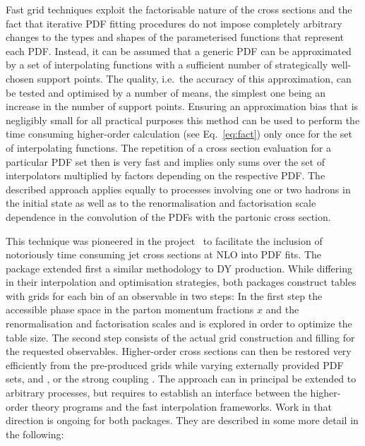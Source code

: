   Fast grid techniques exploit the factorisable nature of the cross sections and 
  the fact that iterative PDF fitting
  procedures do not impose completely arbitrary changes to the types
  and shapes of the parameterised functions that represent each PDF\@.
  Instead, it can be assumed that a generic PDF can be approximated by
  a set of interpolating functions with a sufficient number of
  strategically well-chosen support points. The quality, i.e.\ the
  accuracy of this approximation, can be tested and optimised by a
  number of means, the simplest one being an increase in the number of
  support points. Ensuring an approximation bias that is negligibly
  small for all practical purposes this method can be used to perform
  the time consuming higher-order calculation (see Eq.~\ref{eq:fact})
  only once for the set of interpolating functions. 
  The repetition of a cross section evaluation for
  a particular PDF set then is very fast and implies only sums over
  the set of interpolators multiplied by factors depending on the
  respective PDF\@. The described approach applies equally to
  processes involving one or two hadrons in the initial state as well
  as to the renormalisation and factorisation scale dependence in the
  convolution of the PDFs with the partonic cross section.

  This technique was pioneered in the \fastnlo
  project~\cite{Kluge:2006xs} to facilitate the inclusion of
  notoriously time consuming jet cross sections at NLO into PDF fits.
  The \applgrid~\cite{Carli:2010rw} package extended first a similar
  methodology to DY production. While differing in their interpolation
  and optimisation strategies, both packages construct tables with
  grids for each bin of an observable in two steps: In the first step
  the accessible phase space in the parton momentum fractions $x$ and
  the renormalisation and factorisation scales \mur and \muf is
  explored in order to optimize the table size. The second step
  consists of the actual grid construction and filling for the
  requested observables. Higher-order cross sections can then be
  restored very efficiently from the pre-produced grids while varying
  externally provided PDF sets, \mur and \muf, or the strong coupling
  \asq\@. The approach can in principal be extended to arbitrary
  processes, but requires to establish an interface between the
  higher-order theory programs and the fast interpolation
  frameworks. Work in that direction is ongoing for both packages.
  They are described in some more detail in the following:

